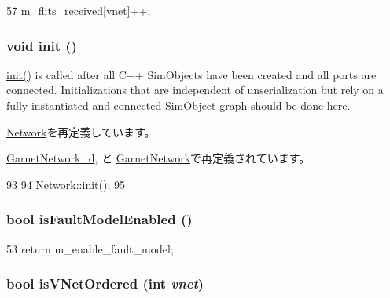 \begin{DoxyCode}
57 { m_flits_received[vnet]++; }
\end{DoxyCode}
\hypertarget{classBaseGarnetNetwork_a02fd73d861ef2e4aabb38c0c9ff82947}{
\subsubsection[{init}]{\setlength{\rightskip}{0pt plus 5cm}void init ()}}
\label{classBaseGarnetNetwork_a02fd73d861ef2e4aabb38c0c9ff82947}
\hyperlink{classBaseGarnetNetwork_a02fd73d861ef2e4aabb38c0c9ff82947}{init()} is called after all C++ SimObjects have been created and all ports are connected. Initializations that are independent of unserialization but rely on a fully instantiated and connected \hyperlink{classSimObject}{SimObject} graph should be done here. 

\hyperlink{classNetwork_a02fd73d861ef2e4aabb38c0c9ff82947}{Network}を再定義しています。

\hyperlink{classGarnetNetwork__d_a02fd73d861ef2e4aabb38c0c9ff82947}{GarnetNetwork\_\-d}, と \hyperlink{classGarnetNetwork_a02fd73d861ef2e4aabb38c0c9ff82947}{GarnetNetwork}で再定義されています。


\begin{DoxyCode}
93 {
94     Network::init();
95 }
\end{DoxyCode}
\hypertarget{classBaseGarnetNetwork_a1dc6b2b6c8275ad36b74beff43e89390}{
\subsubsection[{isFaultModelEnabled}]{\setlength{\rightskip}{0pt plus 5cm}bool isFaultModelEnabled ()}}
\label{classBaseGarnetNetwork_a1dc6b2b6c8275ad36b74beff43e89390}



\begin{DoxyCode}
53 {return m_enable_fault_model;}
\end{DoxyCode}
\hypertarget{classBaseGarnetNetwork_a52d31485b47857b8e7eb4a89efdf56a6}{
\subsubsection[{isVNetOrdered}]{\setlength{\rightskip}{0pt plus 5cm}bool isVNetOrdered (int {\em vnet})}}
\label{classBaseGarnetNetwork_a52d31485b47857b8e7eb4a89efdf56a6}



